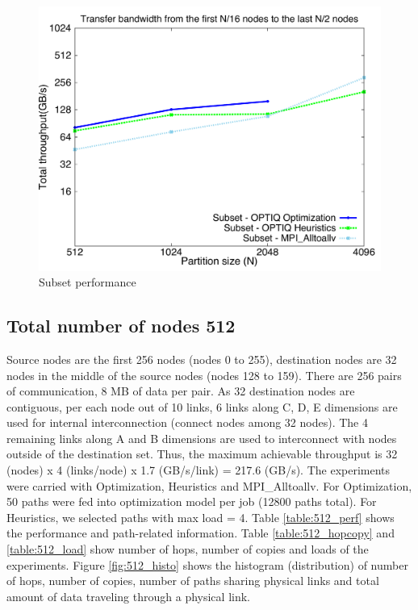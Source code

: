 \documentclass[letter]{article}
\begin{document}
\begin{figure}[h]
\vspace{-0.1in}
\centering
\includegraphics[scale=0.30]{report_figures/constantr_subset.pdf}
\vspace{-0.1in}
\caption{Subset performance}
\vspace{-0.1in}
\label{fig:patterns}
\end{figure}

\subsection {Total number of nodes 512}

Source nodes are the first 256 nodes (nodes 0 to 255), destination nodes are 32 nodes in the middle of the source nodes (nodes 128 to 159). There are 256 pairs of communication, 8 MB of data per pair. As 32 destination nodes are contiguous, per each node out of 10 links, 6 links along C, D, E dimensions are used for internal interconnection (connect nodes among 32 nodes). The 4 remaining links along A and B dimensions are used to interconnect with nodes outside of the destination set. Thus, the maximum achievable throughput is 32 (nodes) x 4 (links/node) x 1.7 (GB/s/link) = 217.6 (GB/s). The experiments were carried with Optimization, Heuristics and MPI\_Alltoallv. For Optimization, 50 paths were fed into optimization model per job (12800 paths total). For Heuristics, we selected paths with max load = 4. Table \ref{table:512_perf} shows the performance and path-related information. Table \ref{table:512_hopcopy} and \ref{table:512_load} show number of hops, number of copies and loads of the experiments. Figure \ref{fig:512_histo} shows the histogram (distribution) of number of hops, number of copies, number of paths sharing physical links and total amount of data traveling through a physical link.
\end{document}
